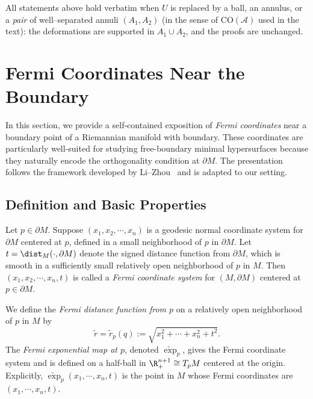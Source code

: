 \begin{remark}
All statements above hold verbatim when $U$ is replaced by a ball, an annulus, or a \emph{pair}
of well–separated annuli $(A_1,A_2)$ (in the sense of $\mathrm{CO}(\mathcal A)$ used in the text):
the deformations are supported in $A_1\cup A_2$, and the proofs are unchanged.
\end{remark}

\section{Fermi Coordinates Near the Boundary}\label{sec:fermi-coordinates}

In this section, we provide a self-contained exposition of \emph{Fermi coordinates} near a boundary
point of a Riemannian manifold with boundary. These coordinates are particularly well-suited for
studying free-boundary minimal hypersurfaces because they naturally encode the orthogonality
condition at $\partial M$. The presentation follows the framework developed by Li--Zhou~\cite{LZ17}
and is adapted to our setting.

\subsection{Definition and Basic Properties}

\begin{definition}\label{def:fermi-coordinates}
Let $p \in \partial M$. Suppose $(x_1,x_2,\cdots,x_n)$ is a geodesic normal coordinate system for
$\partial M$ centered at $p$, defined in a small neighborhood of $p$ in $\partial M$. Let
$t=\dist_M(\cdot,\partial M)$ denote the signed distance function from $\partial M$, which is
smooth in a sufficiently small relatively open neighborhood of $p$ in $M$. Then
$(x_1,x_2,\cdots,x_n,t)$ is called a \emph{Fermi coordinate system} for $(M,\partial M)$ centered
at $p \in \partial M$.

We define the \emph{Fermi distance function from $p$} on a relatively open neighborhood of $p$ in
$M$ by
\begin{equation}\label{eq:fermi-distance}
\tilde r=\tilde r_p(q):=\sqrt{x_1^2+\cdots+x_n^2+t^2}.
\end{equation}
The \emph{Fermi exponential map at $p$}, denoted $\tilde{\exp}_p$, gives the Fermi coordinate
system and is defined on a half-ball in $\R^{n+1}_+ \cong T_pM$ centered at the origin. Explicitly,
$\tilde{\exp}_p(x_1,\cdots,x_n,t)$ is the point in $M$ whose Fermi coordinates are
$(x_1,\cdots,x_n,t)$.
\end{definition}

